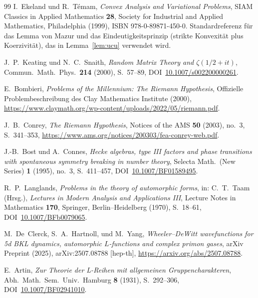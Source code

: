 \documentclass[11pt]{article}
\theoremstyle{definition}
\theoremstyle{remark}
\begin{document}
\begin{thebibliography}{99}
I.~Ekeland und R.~T\'emam, \emph{Convex Analysis and Variational
Problems}, SIAM Classics in Applied Mathematics \textbf{28}, Society
for Industrial and Applied Mathematics, Philadelphia (1999),
ISBN 978-0-89871-450-0. Standardreferenz für das Lemma von Mazur und
das Eindeutigkeitsprinzip (strikte Konvexität plus Koerzivität), das in
Lemma~\ref{lem:ucu} verwendet wird.


J.~P.~Keating und N.~C.~Snaith, \emph{Random Matrix Theory and
$\zeta(1/2 + it)$}, Commun.\ Math.\ Phys.\ \textbf{214} (2000),
S.~57--89, DOI~\href{https://doi.org/10.1007/s002200000261}{10.1007/s002200000261}.

E.~Bombieri, \emph{Problems of the Millennium: The Riemann
Hypothesis}, Offizielle Problembeschreibung des Clay Mathematics Institute (2000),
\url{https://www.claymath.org/wp-content/uploads/2022/05/riemann.pdf}.

J.~B.~Conrey, \emph{The Riemann Hypothesis}, Notices of the AMS
\textbf{50} (2003), no.~3, S.~341--353,
\url{https://www.ams.org/notices/200303/fea-conrey-web.pdf}.

J.-B.~Bost und A.~Connes, \emph{Hecke algebras, type III factors
and phase transitions with spontaneous symmetry breaking in number
theory}, Selecta Math.\ (New Series) \textbf{1} (1995), no.~3,
S.~411--457,
DOI~\href{https://doi.org/10.1007/BF01589495}{10.1007/BF01589495}.

R.~P.~Langlands, \emph{Problems in the theory of automorphic
forms}, in: C.~T.~Taam (Hrsg.), \emph{Lectures in Modern Analysis
and Applications III}, Lecture Notes in Mathematics \textbf{170},
Springer, Berlin--Heidelberg (1970), S.~18--61,
DOI~\href{https://doi.org/10.1007/BFb0079065}{10.1007/BFb0079065}.

M.~De~Clerck, S.~A.~Hartnoll, und M.~Yang,
\emph{Wheeler--DeWitt wavefunctions for 5d BKL dynamics, automorphic
$L$-functions and complex primon gases}, arXiv Preprint (2025),
arXiv:2507.08788 [hep-th],
\url{https://arxiv.org/abs/2507.08788}.

E.~Artin, \emph{Zur Theorie der L-Reihen mit allgemeinen
Gruppencharakteren}, Abh.\ Math.\ Sem.\ Univ.\ Hamburg \textbf{8}
(1931), S.~292--306,
DOI~\href{https://doi.org/10.1007/BF02941010}{10.1007/BF02941010}.


\end{thebibliography}
\end{document}
